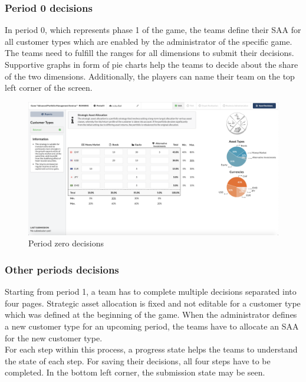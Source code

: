 \subsubsection{Period 0 decisions}
In period 0, which represents phase 1 of the game, the teams define their SAA for all customer types which are enabled by the administrator of the specific game. The teams need to fulfill the ranges for all dimensions to submit their decisions. Supportive graphs in form of pie charts help the teams to decide about the share of the two dimensions. Additionally, the players can name their team on the top left corner of the screen.
\begin{figure}[h!]
  \centering
  \includegraphics[scale=0.2]{img/application-overview/teams/02_period_zero_decisions.png}
  \caption{Period zero decisions}
\end{figure}

\subsubsection{Other periods decisions}
Starting from period 1, a team has to complete multiple decisions separated into four pages. Strategic asset allocation is fixed and not editable for a customer type which was defined at the beginning of the game. When the administrator defines a new customer type for an upcoming period, the teams have to allocate an SAA for the new customer type.\\

For each step within this process, a progress state helps the teams to understand the state of each step. For saving their decisions, all four steps have to be completed. In the bottom left corner, the submission state may be seen.

